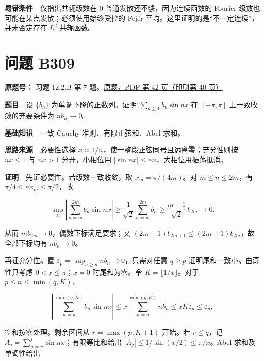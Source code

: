 \documentclass[11pt,a4paper]{article}
\begin{document}
\textbf{易错条件}　仅指出共轭级数在 \(0\) 普通发散还不够，因为连续函数的
Fourier 级数也可能在某点发散；必须使用始终受控的 Fejér
平均。这里证明的是``不一定连续''，并未否定存在 \(L^2\) 共轭函数。

\section{问题 B309}\label{ux95eeux9898-b309}

\textbf{原题号：} 习题 12.2.B 第 7
题。\href{https://zj139.github.io/math-notes/files/problems/楼分析习题-v2.pdf\#page=42}{原题，PDF
第 42 页（印刷第 40 页）}

\textbf{题目}　设 \(\{b_n\}\) 为单调下降的正数列。证明
\(\sum_{n\ge1}b_n\sin nx\) 在 \([-\pi,\pi]\) 上一致收敛的充要条件为
\(nb_n\to0\)。

\textbf{基础知识}　一致 Cauchy 准则、有限正弦和、Abel 求和。

\textbf{思路来源}　必要性选择
\(x\asymp1/n\)，使一整段正弦同号且远离零；充分性则按 \(nx\le1\) 与
\(nx>1\) 分开，小相位用 \(|\sin nx|\le nx\)，大相位用振荡抵消。

\textbf{证明}　先证必要性。若级数一致收敛，取 \(x_m=\pi/(4m)\)。对
\(m\le n\le2m\)，有 \(\pi/4\le nx_m\le\pi/2\)，故

\begin{equation}
\sup_x\left|\sum_{n=m}^{2m}b_n\sin nx\right|
\ge\frac1{\sqrt2}\sum_{n=m}^{2m}b_n
\ge\frac{m+1}{\sqrt2}\,b_{2m}\longrightarrow0.
\tag{31}
\end{equation}

从而 \(mb_{2m}\to0\)，偶数下标满足要求；又
\((2m+1)b_{2m+1}\le(2m+1)b_{2m}\)，故全部下标均有 \(nb_n\to0\)。

再证充分性。置 \(\varepsilon_p=\sup_{n\ge p}nb_n\to0\)，只需对任意
\(q\ge p\) 证明尾和一致小。由奇性只考虑 \(0<x\le\pi\)；\(x=0\)
时尾和为零。令 \(K=\lfloor1/x\rfloor\)。对于 \(p\le n\le\min(q,K)\)，

\begin{equation}
\left|\sum_{n=p}^{\min(q,K)}b_n\sin nx\right|
\le x\sum_{n=p}^{\min(q,K)}nb_n
\le xK\varepsilon_p\le\varepsilon_p,
\tag{32}
\end{equation}

空和按零处理。剩余区间从 \(r=\max(p,K+1)\) 开始。若 \(r\le q\)，记
\(A_j=\sum_{n=r}^j\sin nx\)；有限等比和给出
\(|A_j|\le1/\sin(x/2)\le\pi/x\)。Abel 求和及单调性给出
\end{document}
